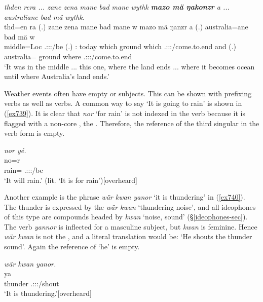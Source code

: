 \begin{exe}
	\ex \emph{thden rera ... zane zena mane bad mane wythk \textbf{mazo mä ŋakonzr} a ... australiane bad mä wythk.}\\
	\gll thd=en ra (.) zane zena mane bad mane w mazo mä ŋanzr a (.) australia=ane bad mä w\\
	middle=Loc{} \Tsg.\F:\Sbj:\Pst:\Ipfv/be (.) \Dem:{\Prox} today which ground which \Tsg.\F:\Sbj:\Nonpast:\Ipfv/come.to.end and (.) australia={\Poss} ground where \Tsg.\F:\Sbj:\Nonpast:\Ipfv/come.to.end\\
	\trans `It was in the middle ... this one, where the land ends ... where it becomes ocean until where Australia's land ends.'
	\label{ex559}
\end{exe}

Weather events often have empty or  subjects. This can be shown with prefixing verbs as well as  verbs. A common way to say `It is going to rain' is shown in (\ref{ex739}). It is clear that \emph{nor} `for rain' is not indexed in the verb because it is flagged with a non-core , the  . Therefore, the reference of the third singular in the verb form is empty.

\begin{exe}
	\ex \emph{nor yé.}\\
	\gll no=r \\
	rain={\Purp} \Tsg.\Masc:\Sbj:\Nonpast:\Ipfv/be\\
	\trans `It will rain.' (lit. `It is for rain'){\hspace*{1pt}\hfill{\footnotesize{[overheard]}}}
	\label{ex739}
\end{exe}

Another example is the phrase \emph{wär kwan yanor} `it is thundering' in (\ref{ex740}). The thunder is expressed by the  \emph{wär kwan} `thundering noise', and all ideophones of this type are  compounds headed by \emph{kwan} `noise, sound' ({\S}\ref{ideophones-sec}). The verb \emph{yannor} is inflected for a masculine subject, but \emph{kwan} is feminine. Hence \emph{wär kwan} is not the , and a literal translation would be: `He shouts the thunder sound'. Again the reference of `he' is empty.

\begin{exe}
	\ex \emph{wär kwan yanor.}\\
	 ya\\
	thunder \Tsg.\Masc:\Sbj:\Nonpast:\Ipfv/shout\\
	\trans `It is thundering.'{\hspace*{1pt}\hfill{\footnotesize{[overheard]}}}
	\label{ex740}
\end{exe}

